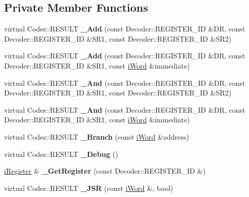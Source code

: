 \subsection*{Private Member Functions}
\begin{DoxyCompactItemize}
\item 
\hypertarget{classWi11_a82892426bc10c28481476ee9fdfc163d}{
virtual Codes::RESULT {\bfseries \_\-Add} (const Decoder::REGISTER\_\-ID \&DR, const Decoder::REGISTER\_\-ID \&SR1, const Decoder::REGISTER\_\-ID \&SR2)}
\label{classWi11_a82892426bc10c28481476ee9fdfc163d}

\item 
\hypertarget{classWi11_a858c595ea8ef9c96a13c579e0de5b5e6}{
virtual Codes::RESULT {\bfseries \_\-Add} (const Decoder::REGISTER\_\-ID \&DR, const Decoder::REGISTER\_\-ID \&SR1, const \hyperlink{classiWord}{iWord} \&immediate)}
\label{classWi11_a858c595ea8ef9c96a13c579e0de5b5e6}

\item 
\hypertarget{classWi11_a75d0c6dd25cf3268da64475243b4a622}{
virtual Codes::RESULT {\bfseries \_\-And} (const Decoder::REGISTER\_\-ID \&DR, const Decoder::REGISTER\_\-ID \&SR1, const Decoder::REGISTER\_\-ID \&SR2)}
\label{classWi11_a75d0c6dd25cf3268da64475243b4a622}

\item 
\hypertarget{classWi11_a276affccb92fa84d879ed1b5081247f4}{
virtual Codes::RESULT {\bfseries \_\-And} (const Decoder::REGISTER\_\-ID \&DR, const Decoder::REGISTER\_\-ID \&SR1, const \hyperlink{classiWord}{iWord} \&immediate)}
\label{classWi11_a276affccb92fa84d879ed1b5081247f4}

\item 
\hypertarget{classWi11_a01960bc45e7a70a276d91ff01cd637f9}{
virtual Codes::RESULT {\bfseries \_\-Branch} (const \hyperlink{classiWord}{iWord} \&address)}
\label{classWi11_a01960bc45e7a70a276d91ff01cd637f9}

\item 
\hypertarget{classWi11_a10d6c79140c97919e2778d1c4d6f8102}{
virtual Codes::RESULT {\bfseries \_\-Debug} ()}
\label{classWi11_a10d6c79140c97919e2778d1c4d6f8102}

\item 
\hypertarget{classWi11_a22228a86b6d5c60c8f403e8fc087077f}{
\hyperlink{classiRegister}{iRegister} \& {\bfseries \_\-GetRegister} (const Decoder::REGISTER\_\-ID \&)}
\label{classWi11_a22228a86b6d5c60c8f403e8fc087077f}

\item 
\hypertarget{classWi11_a52b3325579e31ff96b4b441e682f7a9d}{
virtual Codes::RESULT {\bfseries \_\-JSR} (const \hyperlink{classiWord}{iWord} \&, bool)}
\label{classWi11_a52b3325579e31ff96b4b441e682f7a9d}


\end{DoxyCompactItemize}
